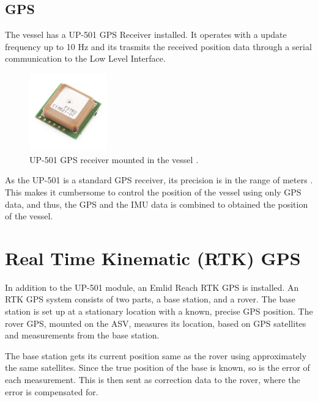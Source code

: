 \subsection{GPS}
The vessel has a UP-501 GPS Receiver installed. It operates with a update frequency up to 10 Hz and its trasmits the received position data through a serial communication to the Low Level Interface. \cite{GPS}
%
\begin{figure}[H]
	\includegraphics[width=0.3\textwidth]{figures/GPS}
	\caption{UP-501 GPS receiver mounted in the vessel \cite{GPS}.}
	\label{fig:GPS}
\end{figure}
%
As the UP-501 is a standard GPS receiver, its precision is in the range of meters . This makes it cumbersome to control the position of the vessel using only GPS data, and thus, the GPS and the IMU data is combined to obtained the position of the vessel.

\section{Real Time Kinematic (RTK) GPS}
In addition to the UP-501 module, an Emlid Reach RTK GPS is installed. 
An RTK GPS system consists of two parts, a base station, and a rover.
The base station is set up at a stationary location with a known, precise GPS position.
The rover GPS, mounted on the ASV, measures its location, based on GPS satellites and measurements from the base station.

The base station gets its current position same as the rover using approximately the same satellites. Since the true position of the base is known, so is the error of each measurement. This is then sent as correction data to the rover, where the error is compensated for.

